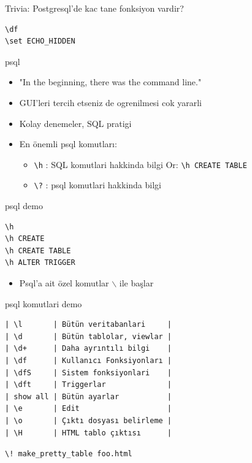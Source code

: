 \documentclass[presentation]{beamer}
\begin{document}
\begin{frame}[fragile,label=sec-7]{Trivia: Postgresql'de kac tane fonksiyon vardir?}
 \begin{verbatim}
\df
\set ECHO_HIDDEN
\end{verbatim}
\end{frame}

\begin{frame}[fragile,label=sec-8]{psql}
 \begin{itemize}
\item "In the beginning, there was the command line."
\item GUI'leri tercih etseniz de ogrenilmesi cok yararli
\item Kolay denemeler, SQL pratigi
\item En önemli psql komutları:
\begin{itemize}
\item \texttt{\textbackslash{}h} : SQL komutlari hakkinda bilgi
Or: \texttt{\textbackslash{}h CREATE TABLE}
\item \texttt{\textbackslash{}?} : psql komutlari hakkinda bilgi
\end{itemize}
\end{itemize}
\end{frame}

\begin{frame}[fragile,label=sec-9]{psql demo}
 \begin{verbatim}
\h
\h CREATE
\h CREATE TABLE
\h ALTER TRIGGER
\end{verbatim}

\begin{itemize}
\item Psql'a ait özel komutlar $\backslash$ ile başlar
\end{itemize}
\end{frame}

\begin{frame}[fragile,label=sec-10]{psql komutlari demo}
 \begin{verbatim}
| \l       | Bütün veritabanlari     |
| \d       | Bütün tablolar, viewlar |
| \d+      | Daha ayrıntılı bilgi    |
| \df      | Kullanıcı Fonksiyonları |
| \dfS     | Sistem fonksiyonlari    |
| \dft     | Triggerlar              |
| show all | Bütün ayarlar           |
| \e       | Edit                    |
| \o       | Çıktı dosyası belirleme |
| \H       | HTML tablo çıktısı      |
\end{verbatim}


\texttt{\textbackslash{}!  make\_pretty\_table foo.html}
\end{frame}
\end{document}
